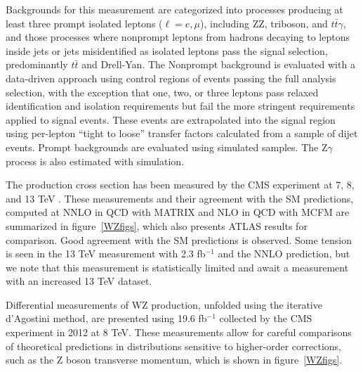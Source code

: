 \documentclass[10pt]{article}
\begin{document}
Backgrounds for this measurement are categorized into processes producing at least
three prompt isolated leptons ($\ell = e, \mu$), including ZZ, triboson, and 
$t\bar{t}\gamma$, and those processes where nonprompt
leptons from hadrons decaying to leptons inside jets or jets misidentified as isolated
leptons pass the signal selection, predominantly $t\bar{t}$ and Drell-Yan. 
The Nonprompt background is evaluated with a data-driven approach using 
control regions of events passing the full analysis selection,
with the exception that one, two, or three leptons pass relaxed identification 
and isolation requirements but fail the more stringent requirements applied to signal events.
These events are extrapolated into the signal region using per-lepton 
``tight to loose'' transfer factors
calculated from a sample of dijet events. Prompt backgrounds are evaluated using 
simulated samples. The Z$\gamma$ process is also estimated with simulation.


The production cross section has been measured by the CMS experiment at 7, 8, 
\cite{Khachatryan:2016poo}
and 13 TeV
\cite{Khachatryan:2016tgp}.
These measurements and their agreement with the SM
predictions, computed at NNLO in QCD with MATRIX and NLO in QCD with MCFM \cite{bleh}
are summarized in figure~\ref{WZfigs}, which also presents ATLAS results for comparison. 
Good agreement with the SM predictions
is observed. Some tension is seen in the 13 TeV measurement with 2.3 fb$^{-1}$
and the NNLO prediction, but we note that this measurement is statistically
limited and await a measurement with an increased 13 TeV dataset.

Differential measurements of WZ production, unfolded using the 
iterative d'Agostini \cite{bleh} method, are presented using 19.6 fb$^{-1}$
collected by the CMS experiment in 2012 at 8 TeV. These measurements allow for careful
comparisons of theoretical predictions in distributions sensitive 
to higher-order corrections, such as the Z boson transverse momentum, which is
shown in figure~\ref{WZfigs}.
\end{document}
